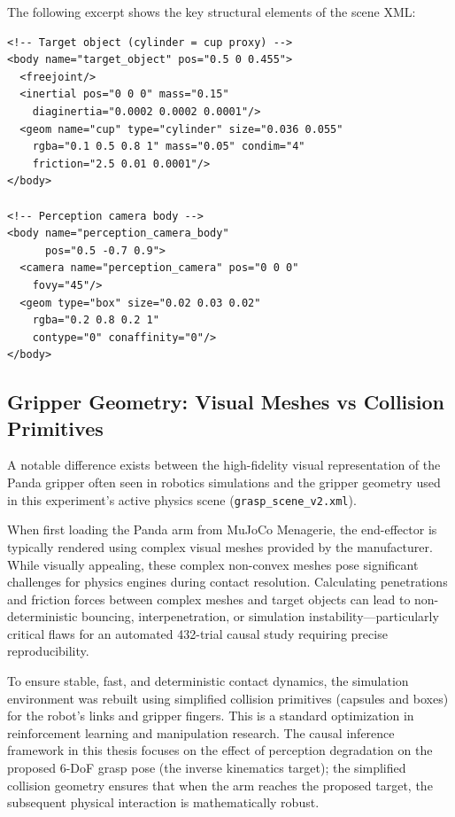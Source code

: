 \documentclass[11pt,a4paper]{report}
\begin{document}
The following excerpt shows the key structural elements of the scene XML:

\begin{lstlisting}[style=xml,caption={Excerpt from \texttt{grasp\_scene\_v2.xml} showing the target object and perception camera.},label={lst:scene_xml}]
<!-- Target object (cylinder = cup proxy) -->
<body name="target_object" pos="0.5 0 0.455">
  <freejoint/>
  <inertial pos="0 0 0" mass="0.15"
    diaginertia="0.0002 0.0002 0.0001"/>
  <geom name="cup" type="cylinder" size="0.036 0.055"
    rgba="0.1 0.5 0.8 1" mass="0.05" condim="4"
    friction="2.5 0.01 0.0001"/>
</body>

<!-- Perception camera body -->
<body name="perception_camera_body"
      pos="0.5 -0.7 0.9">
  <camera name="perception_camera" pos="0 0 0"
    fovy="45"/>
  <geom type="box" size="0.02 0.03 0.02"
    rgba="0.2 0.8 0.2 1"
    contype="0" conaffinity="0"/>
</body>
\end{lstlisting}

\subsection{Gripper Geometry: Visual Meshes vs Collision Primitives}
\label{sec:gripper_geometry}

A notable difference exists between the high-fidelity visual representation of the Panda gripper often seen in robotics simulations and the gripper geometry used in this experiment's active physics scene (\texttt{grasp\_scene\_v2.xml}). 

When first loading the Panda arm from MuJoCo Menagerie, the end-effector is typically rendered using complex visual meshes provided by the manufacturer. While visually appealing, these complex non-convex meshes pose significant challenges for physics engines during contact resolution. Calculating penetrations and friction forces between complex meshes and target objects can lead to non-deterministic bouncing, interpenetration, or simulation instability---particularly critical flaws for an automated 432-trial causal study requiring precise reproducibility.

To ensure stable, fast, and deterministic contact dynamics, the simulation environment was rebuilt using simplified collision primitives (capsules and boxes) for the robot's links and gripper fingers. This is a standard optimization in reinforcement learning and manipulation research. The causal inference framework in this thesis focuses on the effect of perception degradation on the proposed 6-DoF grasp pose (the inverse kinematics target); the simplified collision geometry ensures that when the arm reaches the proposed target, the subsequent physical interaction is mathematically robust.
\end{document}

